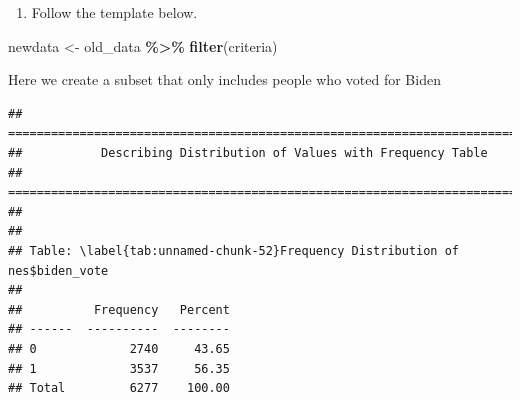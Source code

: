 \documentclass[
]{book}
\newenvironment{Shaded}{\begin{snugshade}}{\end{snugshade}}
\newcommand{\AttributeTok}[1]{\textcolor[rgb]{0.13,0.29,0.53}{#1}}
\newcommand{\CommentTok}[1]{\textcolor[rgb]{0.56,0.35,0.01}{\textit{#1}}}
\newcommand{\DecValTok}[1]{\textcolor[rgb]{0.00,0.00,0.81}{#1}}
\newcommand{\FunctionTok}[1]{\textcolor[rgb]{0.13,0.29,0.53}{\textbf{#1}}}
\newcommand{\NormalTok}[1]{#1}
\newcommand{\OtherTok}[1]{\textcolor[rgb]{0.56,0.35,0.01}{#1}}
\newcommand{\SpecialCharTok}[1]{\textcolor[rgb]{0.81,0.36,0.00}{\textbf{#1}}}
\providecommand{\tightlist}{%
  \setlength{\itemsep}{0pt}\setlength{\parskip}{0pt}}
\begin{document}
\begin{enumerate}
\def\labelenumi{\arabic{enumi}.}
\tightlist
\item
  Follow the template below.
\end{enumerate}

\begin{Shaded}
\begin{Highlighting}[]
\NormalTok{newdata }\OtherTok{\textless{}{-}}\NormalTok{ old\_data }\SpecialCharTok{\%\textgreater{}\%}
  \FunctionTok{filter}\NormalTok{(criteria)}
\end{Highlighting}
\end{Shaded}

Here we create a subset that only includes people who voted for Biden

\begin{Shaded}
\end{Shaded}

\begin{verbatim}
## ===========================================================================
##           Describing Distribution of Values with Frequency Table
## ===========================================================================
## 
## 
## Table: \label{tab:unnamed-chunk-52}Frequency Distribution of nes$biden_vote
## 
##          Frequency   Percent
## ------  ----------  --------
## 0             2740     43.65
## 1             3537     56.35
## Total         6277    100.00
\end{verbatim}

\begin{Shaded}
\end{Shaded}
\end{document}

